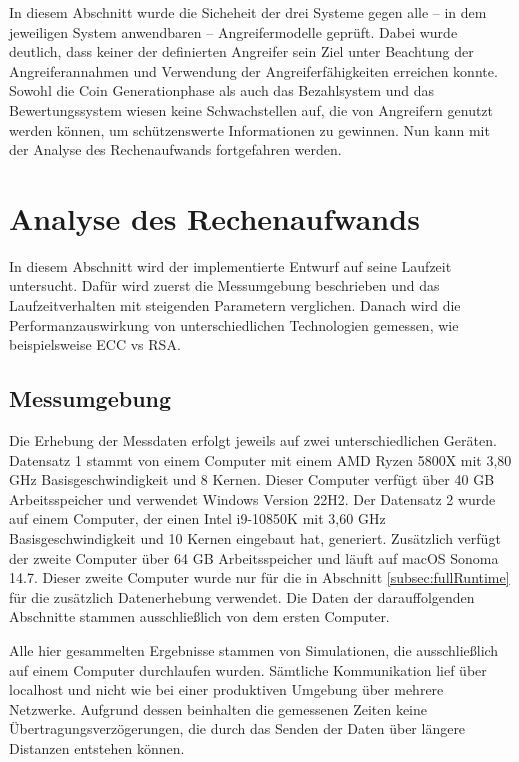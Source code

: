 \documentclass[
	fontsize=11pt,
	headings=small,
	parskip=half,           %
	bibliography=totoc,
	numbers=noenddot,       %
	open=any,               %
]{scrreprt}
\begin{document}
In diesem Abschnitt wurde die Sicheheit der drei Systeme gegen alle -- in dem jeweiligen System anwendbaren -- Angreifermodelle geprüft. Dabei wurde deutlich, dass keiner der definierten Angreifer sein Ziel unter Beachtung der Angreiferannahmen und Verwendung der Angreiferfähigkeiten erreichen konnte. Sowohl die Coin Generationphase als auch das Bezahlsystem und das Bewertungssystem wiesen keine Schwachstellen auf, die von Angreifern genutzt werden können, um schützenswerte Informationen zu gewinnen. Nun kann mit der Analyse des Rechenaufwands fortgefahren werden.

\section{Analyse des Rechenaufwands}
\label{sec:computationTime}
In diesem Abschnitt wird der implementierte Entwurf auf seine Laufzeit untersucht. Dafür wird zuerst die Messumgebung beschrieben und das Laufzeitverhalten mit steigenden Parametern verglichen. Danach wird die Performanzauswirkung von unterschiedlichen Technologien gemessen, wie beispielsweise ECC vs RSA.

\subsection{Messumgebung}
\label{subsec:timeMessureComputer}
Die Erhebung der Messdaten erfolgt jeweils auf zwei unterschiedlichen Geräten. Datensatz 1 stammt von einem Computer mit einem AMD Ryzen 5800X mit 3,80 GHz Basisgeschwindigkeit und 8 Kernen. Dieser Computer verfügt über 40 GB Arbeitsspeicher und verwendet Windows Version 22H2. Der Datensatz 2 wurde auf einem Computer, der einen Intel i9-10850K mit 3,60 GHz Basisgeschwindigkeit und 10 Kernen eingebaut hat, generiert. Zusätzlich verfügt der zweite Computer über 64 GB Arbeitsspeicher und läuft auf macOS Sonoma 14.7. Dieser zweite Computer wurde nur für die in Abschnitt \ref{subsec:fullRuntime} für die zusätzlich Datenerhebung verwendet. Die Daten der darauffolgenden Abschnitte stammen ausschließlich von dem ersten Computer.

Alle hier gesammelten Ergebnisse stammen von Simulationen, die ausschließlich auf einem Computer durchlaufen wurden. Sämtliche Kommunikation lief über localhost und nicht wie bei einer produktiven Umgebung über mehrere Netzwerke. Aufgrund dessen beinhalten die gemessenen Zeiten keine Übertragungsverzögerungen, die durch das Senden der Daten über längere Distanzen entstehen können.
\end{document}
